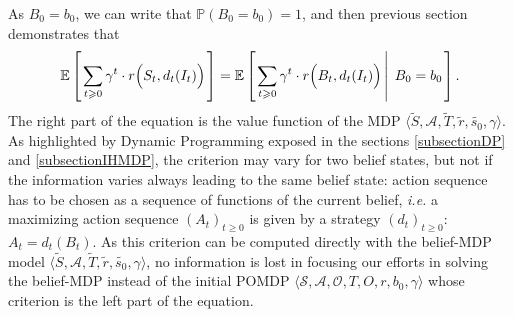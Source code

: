 As $B_0 = b_0$, we can write that $\mathbb{P}(B_0 = b_0) = 1$, and then previous section demonstrates that 
\[ \mathbb{E} \left[ \left.  \sum_{ t \geqslant 0} \gamma^t \cdot r\Big(S_t,d_t(I_t)\Big)  \right. \right] = \mathbb{E} \left[ \left.  \sum_{ t \geqslant 0} \gamma^t \cdot  r\Big(B_t,d_t(I_t)\Big) \, \right| \left. \, B_0 = b_0  \right. \right]. \]
The right part of the equation is the value function of the MDP $\langle \tilde{S}, \mathcal{A}, \tilde{T}, \tilde{r}, \tilde{s_0}, \gamma  \rangle$.
As highlighted by Dynamic Programming exposed in the sections \ref{subsectionDP} and \ref{subsectionIHMDP}, 
the criterion may vary for two belief states, 
but not if the information varies 
always leading to the same belief state:
action sequence has to be chosen as a sequence of functions of the current belief,
\textit{i.e.} a maximizing action sequence $(A_t)_{t \geqslant 0}$ 
is given by a strategy $(d_t)_{t \geqslant 0}$: $A_t = d_t(B_t)$.
As this criterion can be computed directly with the belief-MDP model 
$\langle \tilde{S}, \mathcal{A}, \tilde{T}, \tilde{r}, \tilde{s_0}, \gamma  \rangle$,
no information is lost in focusing our efforts in solving 
the belief-MDP instead of the initial POMDP $\langle \mathcal{S}, \mathcal{A}, \mathcal{O}, T, O, r, b_0, \gamma \rangle$
whose criterion is the left part of the equation. 

